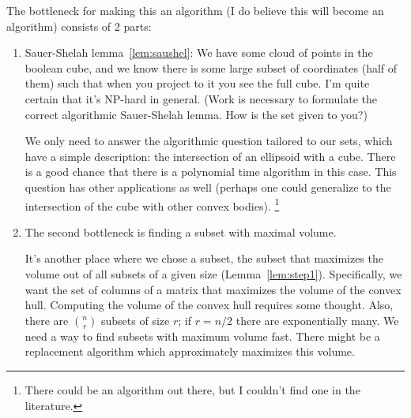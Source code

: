 The bottleneck for making this an algorithm (I do believe this will become an algorithm) consists of 2 parts:
\begin{enumerate}
\item
Sauer-Shelah lemma~\ref{lem:saushel}: We have some cloud of points in the boolean cube, and we know there is some large subset of coordinates (half of them) such that when you project to it you see the full cube.  I'm quite certain that it's NP-hard in general. (Work is necessary to formulate the correct algorithmic Sauer-Shelah lemma. How is the set given to you?) 

We only need to answer the algorithmic question tailored to our sets, which have a simple description: the intersection of an ellipsoid with a cube. There is a good chance that there is a polynomial time algorithm in this case. This question has other applications as well (perhaps one could generalize to the intersection of the cube with other convex bodies).
\footnote{There could be an algorithm out there, but I couldn't find one in the literature.}
\item
The second bottleneck is finding a subset with maximal volume. 

It's another place where we chose a subset, the subset that maximizes the volume out of all subsets of a given size (Lemma~\ref{lem:step1}). Specifically, we want the set of columns of a matrix that maximizes the volume of the convex hull.
Computing the volume of the convex hull requires some thought.
Also, there are $\binom nr$ subsets of size $r$; if $r=n/2$ there are exponentially many. We need a way to find subsets with maximum volume fast. There might be a replacement algorithm which approximately maximizes this volume.
\end{enumerate}

